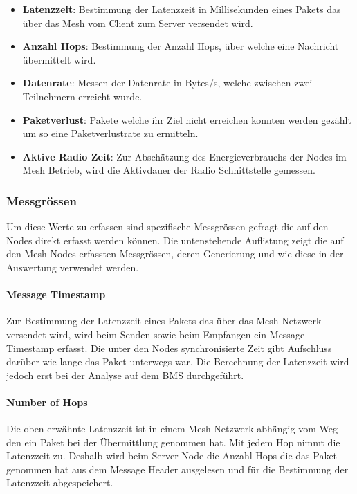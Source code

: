 \begin{itemize}
	\item \textbf{Latenzzeit}: Bestimmung der Latenzzeit in Millisekunden eines Pakets das über das Mesh vom Client zum Server versendet wird.  
	\item \textbf{Anzahl Hops}: Bestimmung der Anzahl Hops, über welche eine Nachricht übermittelt wird.
	\item \textbf{Datenrate}: Messen der Datenrate in Bytes/s, welche zwischen zwei Teilnehmern erreicht wurde. 
	\item \textbf{Paketverlust}: Pakete welche ihr Ziel nicht erreichen konnten werden gezählt um so eine Paketverlustrate zu ermitteln.
	\item \textbf{Aktive Radio Zeit}: Zur Abschätzung des Energieverbrauchs der Nodes im Mesh Betrieb, wird die Aktivdauer der Radio Schnittstelle gemessen.
\end{itemize}


\subsubsection{Messgrössen}\label{subsubsec:Messgrössen}

Um diese Werte zu erfassen sind spezifische Messgrössen gefragt die auf den Nodes direkt erfasst werden können.
Die untenstehende Auflistung zeigt die auf den Mesh Nodes erfassten Messgrössen, deren Generierung und wie diese in der Auswertung verwendet werden.


\paragraph{Message Timestamp}
Zur Bestimmung der Latenzzeit eines Pakets das über das Mesh Netzwerk versendet wird, wird beim Senden sowie beim Empfangen ein Message Timestamp erfasst.
Die unter den Nodes synchronisierte Zeit gibt Aufschluss darüber wie lange das Paket unterwegs war. Die Berechnung der Latenzzeit wird jedoch erst bei der Analyse auf dem BMS durchgeführt.

\paragraph{Number of Hops}
Die oben erwähnte Latenzzeit ist in einem Mesh Netzwerk abhängig vom Weg den ein Paket bei der Übermittlung genommen hat. Mit jedem Hop nimmt die Latenzzeit zu.
Deshalb wird beim Server Node die Anzahl Hops die das Paket genommen hat aus dem Message Header ausgelesen und für die Bestimmung der Latenzzeit abgespeichert.

